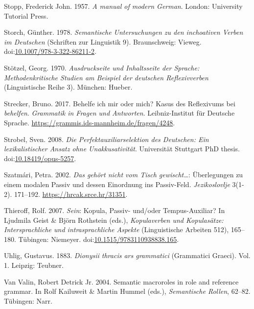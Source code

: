 \leavevmode{}%
Stopp, Frederick John. 1957. \emph{A manual of modern {German}}. London:
University Tutorial Press.

\leavevmode{}%
Storch, Günther. 1978. \emph{Semantische {Untersuchungen} zu den
inchoativen {Verben} im {Deutschen}} (Schriften {zur} Linguistik 9).
Braunschweig: Vieweg.
doi:\href{https://doi.org/10.1007/978-3-322-86211-2}{10.1007/978-3-322-86211-2}.

\leavevmode{}%
Stötzel, Georg. 1970. \emph{Ausdruckseite und {Inhaltsseite} der
{Sprache}: Methodenkritische {Studien} am {Beispiel} der deutschen
{Reflexivverben}} (Linguistische Reihe 3). München: Hueber.

\leavevmode{}%
Strecker, Bruno. 2017. Behelfe ich mir oder mich? {Kasus} des
{Reflexivums} bei \emph{behelfen}. \emph{Grammatik in {Fragen} und
{Antworten}}. Leibniz-Institut für Deutsche Sprache.
\url{https://grammis.ids-mannheim.de/fragen/4248}.

\leavevmode{}%
Strobel, Sven. 2008. \emph{Die {Perfektauxiliarselektion} des
{Deutschen}: {Ein} lexikalistischer {Ansatz} ohne {Unakkusativität}}.
Universität Stuttgart PhD thesis.
doi:\href{https://doi.org/10.18419/opus-5257}{10.18419/opus-5257}.

\leavevmode{}%
Szatmári, Petra. 2002. \emph{Das gehört nicht vom {Tisch}
gewischt\ldots{}}: {Überlegungen} zu einem modalen {Passiv} und dessen
{Einordnung} ins {Passiv-Feld}. \emph{Jezikoslovlje} 3(1-2). 171--192.
\url{https://hrcak.srce.hr/31351}.

\leavevmode{}%
Thieroff, Rolf. 2007. \emph{Sein}: {Kopula}, {Passiv-} und/oder
{Tempus-Auxiliar}? In Ljudmila Geist \& Björn Rothstein (eds.),
\emph{Kopulaverben und {Kopulasätze}: {Intersprachliche} und
intrasprachliche {Aspekte}} (Linguistische Arbeiten 512), 165--180.
Tübingen: Niemeyer.
doi:\href{https://doi.org/10.1515/9783110938838.165}{10.1515/9783110938838.165}.

\leavevmode{}%
Uhlig, Gustavus. 1883. \emph{Dionysii thracis ars grammatici}
(Grammatici Graeci). Vol. 1. Leipzig: Teubner.

\leavevmode{}%
Van Valin, Robert Detrick Jr. 2004. Semantic macroroles in role and
reference grammar. In Rolf Kailuweit \& Martin Hummel (eds.),
\emph{Semantische {Rollen}}, 62--82. Tübingen: Narr.


